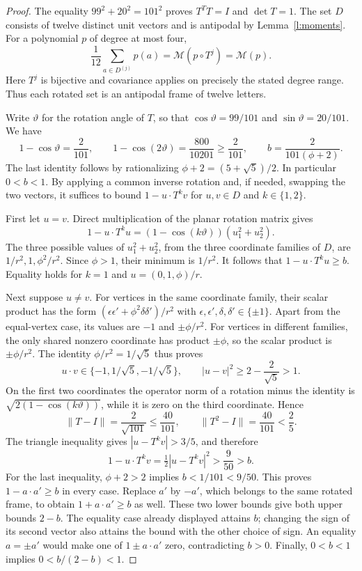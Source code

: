 \begin{proof}
The equality \(99^2+20^2=101^2\) proves \(T^TT=I\) and
\(\det T=1\). The set \(D\) consists of twelve distinct unit
vectors and is antipodal by Lemma~\ref{l:moments}.
For a polynomial \(p\) of degree at most four,
\[
 \frac1{12}\sum_{a\in D^{(j)}}p(a)
       =\mathcal M(p\circ T^j)=\mathcal M(p).
\]
Here \(T^j\) is bijective and covariance applies on precisely
the stated degree range. Thus each rotated set is an antipodal
frame of twelve letters.

Write \(\vartheta\) for the rotation angle of \(T\), so that
\(\cos\vartheta=99/101\) and \(\sin\vartheta=20/101\).
We have
\[
 1-\cos\vartheta=\frac2{101},\qquad
 1-\cos(2\vartheta)=\frac{800}{10201}\ge\frac2{101},
 \qquad
 b=\frac{2}{101(\phi+2)}.
\]
The last identity follows by rationalizing
\(\phi+2=(5+\sqrt5)/2\). In particular \(0<b<1\).
By applying a common inverse rotation and, if needed, swapping
the two vectors, it suffices to bound
\(1-u\cdot T^k v\) for \(u,v\in D\) and \(k\in\{1,2\}\).

First let \(u=v\). Direct multiplication of the planar rotation
matrix gives
\[
 1-u\cdot T^ku
       =(1-\cos(k\vartheta))(u_1^2+u_2^2).
\]
The three possible values of \(u_1^2+u_2^2\), from the three
coordinate families of \(D\), are
\(1/r^2,1,\phi^2/r^2\). Since \(\phi>1\), their minimum is
\(1/r^2\). It follows that \(1-u\cdot T^ku\ge b\).
Equality holds for \(k=1\) and \(u=(0,1,\phi)/r\).

Next suppose \(u\ne v\). For vertices in the same coordinate
family, their scalar product has the form
\((\epsilon\epsilon'+\phi^2\delta\delta')/r^2\) with
\(\epsilon,\epsilon',\delta,\delta'\in\{\pm1\}\).
Apart from the equal-vertex case, its values are
\(-1\) and \(\pm\phi/r^2\). For vertices in different
families, the only shared nonzero coordinate has product
\(\pm\phi\), so the scalar product is \(\pm\phi/r^2\).
The identity \(\phi/r^2=1/\sqrt5\) thus proves
\[
 u\cdot v\in\{-1,1/\sqrt5,-1/\sqrt5\},\qquad
 |u-v|^2\ge2-\frac2{\sqrt5}>1.
\]
On the first two coordinates the operator norm of a rotation minus
the identity is \(\sqrt{2(1-\cos(k\vartheta))}\), while it is
zero on the third coordinate. Hence
\[
 \|T-I\|=\frac2{\sqrt{101}}\le\frac{40}{101},\qquad
 \|T^2-I\|=\frac{40}{101}<\frac25.
\]
The triangle inequality gives \(|u-T^kv|>3/5\), and therefore
\[
 1-u\cdot T^kv=\tfrac12|u-T^kv|^2>\frac9{50}>b.
\]
For the last inequality, \(\phi+2>2\) implies
\(b<1/101<9/50\). This proves \(1-a\cdot a'\ge b\)
in every case. Replace \(a'\) by \(-a'\), which belongs to the
same rotated frame, to obtain \(1+a\cdot a'\ge b\) as well.
These two lower bounds give both upper bounds \(2-b\).
The equality case already displayed attains \(b\); changing the
sign of its second vector also attains the bound with the other
choice of sign. An equality \(a=\pm a'\) would make one of
\(1\pm a\cdot a'\) zero, contradicting \(b>0\).
Finally, \(0<b<1\) implies \(0<b/(2-b)<1\).
\end{proof}

